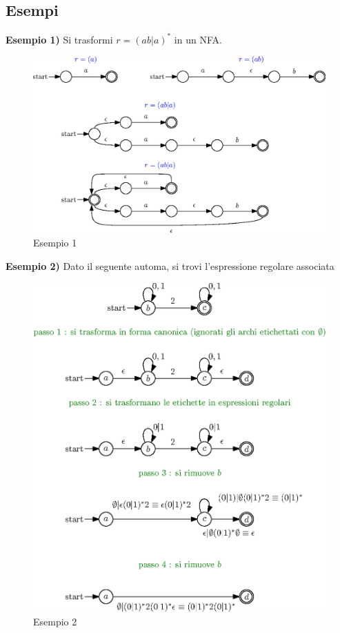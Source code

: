 \documentclass[10pt, letterpaper]{report}
\begin{document}
\subsection{Esempi} 
\textbf{Esempio 1)} Si trasformi $r=(ab|a)^*$ in un NFA.\begin{center}
    \begin{figure}[h!]
        \centering 
        \includegraphics[width=1\textwidth ]{images/esempio1Regex.eps}
        \caption{Esempio 1}
        \label{fig:es1Regex}
    \end{figure}
\end{center}\newpage
\textbf{Esempio 2)} Dato il seguente automa, si trovi l'espressione regolare associata 
\begin{center}
    \begin{figure}[h!]
        \centering 
        \includegraphics[width=1\textwidth ]{images/esempio2Regex.eps}
        \caption{Esempio 2}
        \label{fig:es2Regex}
    \end{figure}
\end{center}\flowerLine \newpage 
\end{document}
